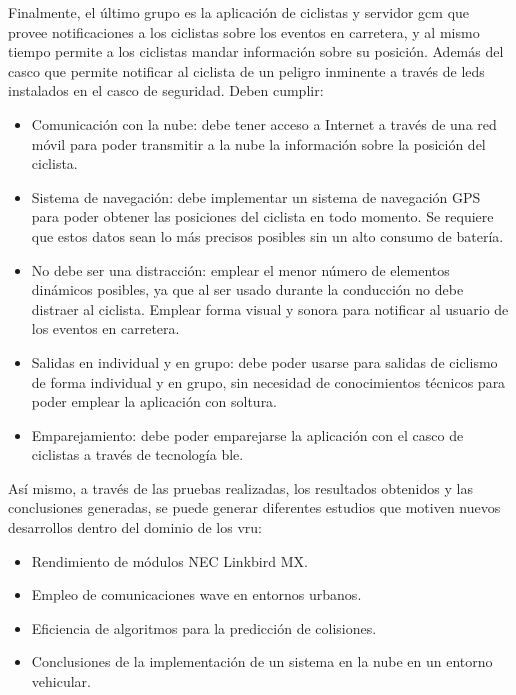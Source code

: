Finalmente, el último grupo es la aplicación de ciclistas y servidor \gls{gcm} que provee notificaciones a los ciclistas sobre los eventos en carretera, y al mismo tiempo permite a los ciclistas mandar información sobre su posición. Además del casco  que permite notificar al ciclista de un peligro inminente a través de leds instalados en el casco de seguridad. Deben cumplir:
\begin{itemize}
	\item Comunicación con la nube: debe tener acceso a Internet a través de una red móvil para poder transmitir a la nube la información sobre la posición del ciclista.
	
	\item Sistema de navegación: debe implementar un sistema de navegación GPS para poder obtener las posiciones del ciclista en todo momento. Se requiere que estos datos sean lo más precisos posibles sin un alto consumo de batería.
	
	\item No debe ser una distracción: emplear el menor número de elementos dinámicos posibles, ya que al ser usado durante la conducción no debe distraer al ciclista. Emplear forma visual y sonora para notificar al usuario de los eventos en carretera.
	
	\item Salidas en individual y en grupo: debe poder usarse para salidas de ciclismo de forma individual y en grupo, sin necesidad de conocimientos técnicos para poder emplear la aplicación con soltura.
	
	\item Emparejamiento: debe poder emparejarse la aplicación con el casco de ciclistas a través de tecnología \gls{ble}.
\end{itemize}

Así mismo, a través de las pruebas realizadas, los resultados obtenidos y las conclusiones generadas, se puede generar diferentes estudios que motiven nuevos desarrollos dentro del dominio de los \gls{vru}:
\begin{itemize}
	\item Rendimiento de módulos NEC Linkbird MX.
	
	\item Empleo de comunicaciones \gls{wave} en entornos urbanos.
	
	\item Eficiencia de algoritmos para la predicción de colisiones.
	
	\item Conclusiones de la implementación de un sistema en la nube en un entorno vehicular.
\end{itemize}
